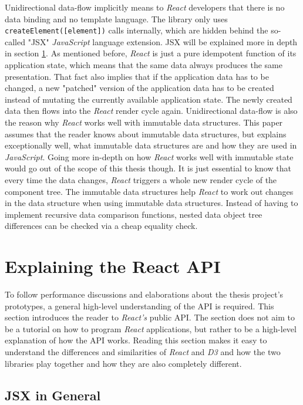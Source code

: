 Unidirectional data-flow implicitly means to \emph{React} developers that there is no data binding and no template language. The library only uses \texttt{createElement([element])} calls internally, which are hidden behind the so-called "JSX" \emph{JavaScript} language extension. JSX will be explained more in depth in section \ref{sec:reactApi}. As mentioned before, \emph{React} is just a pure idempotent function of its application state, which means that the same data always produces the same presentation. That fact also implies that if the application data has to be changed, a new "patched" version of the application data has to be created instead of mutating the currently available application state. The newly created data then flows into the \emph{React} render cycle again. Unidirectional data-flow is also the reason why \emph{React} works well with immutable data structures. This paper assumes that the reader knows about immutable data structures, but \cite{ImmutableJS} explains exceptionally well, what immutable data structures are and how they are used in \emph{JavaScript}. Going more in-depth on how \emph{React} works well with immutable state would go out of the scope of this thesis though. It is just essential to know that every time the data changes,  \emph{React} triggers a whole new render cycle of the component tree. The immutable data structures help \emph{React} to work out changes in the data structure when using immutable data structures. Instead of having to implement recursive data comparison functions, nested data object tree differences can be checked via a cheap equality check.

\section{Explaining the React API}
\label{sec:reactApi}

To follow performance discussions and elaborations about the thesis project's prototypes, a general high-level understanding of the API is required. This section introduces the reader to \emph{React's} public API. The section does not aim to be a tutorial on how to program \emph{React} applications, but rather to be a high-level explanation of how the API works. Reading this section makes it easy to understand the differences and similarities of \emph{React} and \emph{D3} and how the two libraries play together and how they are also completely different.

\subsection{JSX in General}

